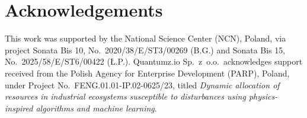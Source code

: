 \documentclass[preprint,12pt,a4paper]{elsarticle}
\begin{document}
\section*{Acknowledgements}
This work was supported by the National Science Center (NCN), Poland, via
project Sonata Bis 10, No.~2020/38/E/ST3/00269 (B.G.) and Sonata Bis 15,
No.~2025/58/E/ST6/00422 ({\L}.P.). Quantumz.io Sp.~z~o.o.\ acknowledges
support received from the Polish Agency for Enterprise Development (PARP),
Poland, under Project No.~FENG.01.01-IP.02-0625/23, titled
\textit{Dynamic allocation of resources in industrial ecosystems susceptible
to disturbances using physics-inspired algorithms and machine learning}.



\end{document}

